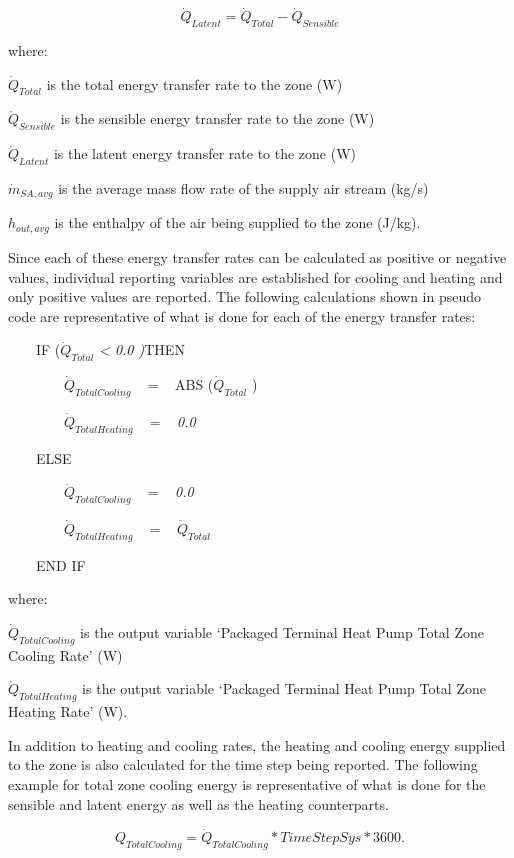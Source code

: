 \begin{equation}
  \dot Q_{Latent} = \dot Q_{Total} - \dot Q_{Sensible}
\end{equation}

where:

\(\dot{Q}_{Total}\) is the total energy transfer rate to the zone (W)

\(\dot{Q}_{Sensible}\) is the sensible energy transfer rate to the zone (W)

\(\dot{Q}_{Latent}\) is the latent energy transfer rate to the zone (W)

\(\dot{m}_{SA,avg}\) is the average mass flow rate of the supply air stream (kg/s)

\(h_{out,avg}\) is the enthalpy of the air being supplied to the zone (J/kg).

Since each of these energy transfer rates can be calculated as positive or negative values, individual reporting variables are established for cooling and heating and only positive values are reported. The following calculations shown in pseudo code are representative of what is done for each of the energy transfer rates:

~~~~IF (\({\dot Q_{Total}}\) \emph{\textless{} 0.0 )}THEN

~~~~~~~~\({\dot Q_{TotalCooling}}\) ~ = ~ ABS (\({\dot Q_{Total}}\) )

~~~~~~~~\({\dot Q_{TotalHeating}}\) ~ = ~ \emph{0.0}

~~~~ELSE

~~~~~~~~\({\dot Q_{TotalCooling}}\) ~ = ~ \emph{0.0}

~~~~~~~~\({\dot Q_{TotalHeating}}\) ~ = ~ \({\dot Q_{Total}}\)

~~~~END IF

where:

\(\dot{Q}_{TotalCooling}\) is the output variable `Packaged Terminal Heat Pump Total Zone Cooling Rate' (W)

\(\dot{Q}_{TotalHeating}\) is the output variable `Packaged Terminal Heat Pump Total Zone Heating Rate' (W).

In addition to heating and cooling rates, the heating and cooling energy supplied to the zone is also calculated for the time step being reported. The following example for total zone cooling energy is representative of what is done for the sensible and latent energy as well as the heating counterparts.

\begin{equation}
  Q_{TotalCooling} = \dot{Q}_{TotalCooling} * TimeStepSys * 3600.
\end{equation}

